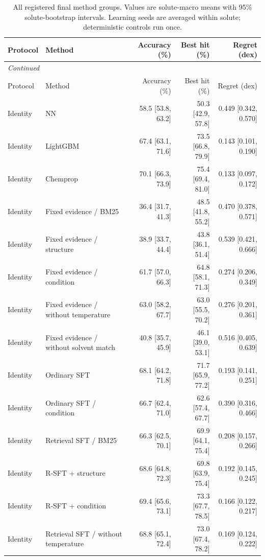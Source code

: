 \begingroup\footnotesize
\setlength{\tabcolsep}{3pt}
\begin{longtable}{lp{.27\linewidth}rrr}
\caption{All registered final method groups. Values are solute-macro means with 95\% solute-bootstrap intervals. Learning seeds are averaged within solute; deterministic controls run once.}\label{tab:all-methods}\\
\toprule
Protocol & Method & Accuracy (\%) & Best hit (\%) & Regret (dex) \\
\midrule
\endfirsthead
\multicolumn{5}{l}{\textit{Continued}} \\
\toprule
Protocol & Method & Accuracy (\%) & Best hit (\%) & Regret (dex) \\
\midrule
\endhead
Identity & NN & 58.5 [53.8, 63.2] & 50.3 [42.9, 57.8] & 0.449 [0.342, 0.570] \\
Identity & LightGBM & 67.4 [63.1, 71.6] & 73.5 [66.8, 79.9] & 0.143 [0.101, 0.190] \\
Identity & Chemprop & 70.1 [66.3, 73.9] & 75.4 [69.4, 81.0] & 0.133 [0.097, 0.172] \\
Identity & Fixed evidence / BM25 & 36.4 [31.7, 41.3] & 48.5 [41.8, 55.2] & 0.470 [0.378, 0.571] \\
Identity & Fixed evidence / structure & 38.9 [33.7, 44.4] & 43.8 [36.1, 51.4] & 0.539 [0.421, 0.666] \\
Identity & Fixed evidence / condition & 61.7 [57.0, 66.3] & 64.8 [58.1, 71.3] & 0.274 [0.206, 0.349] \\
Identity & Fixed evidence / without temperature & 63.0 [58.2, 67.7] & 63.0 [55.5, 70.2] & 0.276 [0.201, 0.361] \\
Identity & Fixed evidence / without solvent match & 40.8 [35.7, 45.9] & 46.1 [39.0, 53.1] & 0.516 [0.405, 0.639] \\
Identity & Ordinary SFT & 68.1 [64.2, 71.8] & 71.7 [65.9, 77.2] & 0.193 [0.141, 0.251] \\
Identity & Ordinary SFT / condition & 66.7 [62.4, 71.0] & 62.6 [57.4, 67.7] & 0.390 [0.316, 0.466] \\
Identity & Retrieval SFT / BM25 & 66.3 [62.5, 70.1] & 69.9 [64.1, 75.4] & 0.208 [0.157, 0.266] \\
Identity & R-SFT + structure & 68.6 [64.8, 72.3] & 69.8 [63.9, 75.4] & 0.192 [0.145, 0.245] \\
Identity & R-SFT + condition & 69.4 [65.6, 73.1] & 73.3 [67.7, 78.5] & 0.166 [0.122, 0.217] \\
Identity & Retrieval SFT / without temperature & 68.8 [65.1, 72.4] & 73.0 [67.4, 78.2] & 0.169 [0.124, 0.222] \\

\end{longtable}
